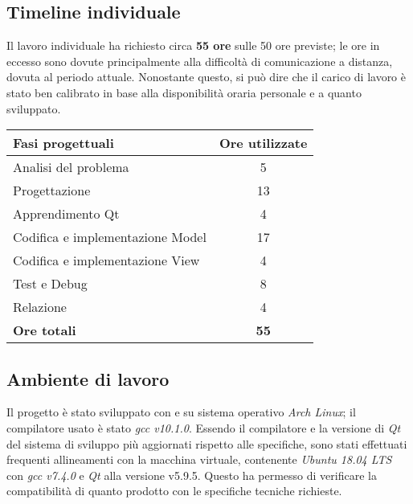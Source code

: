 \subsection{Timeline individuale}
Il lavoro individuale ha richiesto circa \textbf{55 ore} sulle 50 ore previste; le ore in eccesso sono dovute principalmente alla difficoltà di comunicazione a distanza, dovuta al periodo attuale. Nonostante questo, si può dire che il carico di lavoro è stato ben calibrato in base alla disponibilità oraria personale e a quanto sviluppato.
\begin{table}[H]
\begin{center}
\begin{tabular}{l|c}
\textbf{Fasi progettuali}        & \textbf{Ore utilizzate} \\ \hline
Analisi del problema             & 5                       \\
Progettazione                    & 13                      \\
Apprendimento Qt                 & 4                       \\
Codifica e implementazione Model & 17                      \\
Codifica e implementazione View  & 4                       \\
Test e Debug                     & 8                       \\
Relazione                        & 4                       \\ \hline
\textbf{Ore totali}              & \textbf{55}            
\end{tabular}
\end{center}
\end{table}

\subsection{Ambiente di lavoro}
Il progetto è stato sviluppato con  e  su sistema operativo \textit{Arch Linux}; il compilatore usato è stato \textit{gcc v10.1.0}. Essendo il compilatore e la versione di \textit{Qt} del sistema di sviluppo più aggiornati rispetto alle specifiche, sono stati effettuati frequenti allineamenti con la macchina virtuale, contenente \textit{Ubuntu 18.04 LTS} con \textit{gcc v7.4.0} e \textit{Qt} alla versione v5.9.5. Questo ha permesso di verificare la compatibilità di quanto prodotto con le specifiche tecniche richieste.

